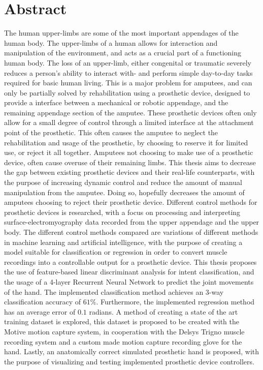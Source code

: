 \documentclass[../main.tex]{subfiles}
\begin{document}
\section*{Abstract}

The human upper-limbs are some of the most important appendages of the human body.
The upper-limbs of a human allows for interaction and manipulation of the environment, and acts as a crucial part of a functioning human body.
The loss of an upper-limb, either congenital or traumatic severely reduces a person's ability to interact with- and perform simple day-to-day tasks
required for basic human living.
This is a major problem for amputees, and can only be partially solved by rehabilitation using a prosthetic device, designed to provide a interface between a mechanical or robotic appendage, and the remaining appendage section of the amputee.
These prosthetic devices often only allow for a small degree of control through a limited interface at the attachment point of the prosthetic.
This often causes the amputee to neglect the rehabilitation and usage of the prosthetic, by choosing to reserve it for limited use, or reject it all together.
Amputees not choosing to make use of a prosthetic device, often cause overuse of their remaining limbs.
This thesis aims to decrease the gap between existing prosthetic devices and their real-life counterparts, with the purpose of increasing dynamic control and reduce the amount of manual manipulation from the amputee.
Doing so, hopefully decreases the amount of amputees choosing to reject their prosthetic device. 
Different control methods for prosthetic devices is researched, with a focus on processing and interpreting surface-electromyography data recorded from the upper appendage and the upper body.
The different control methods compared are variations of different methods in machine learning and artificial intelligence, with the purpose of creating a model suitable for classification or regression in order to convert muscle recordings into a controllable output for a prosthetic device.
This thesis proposes the use of feature-based linear discriminant analysis for intent classification, and the usage of a 4-layer Recurrent Neural Network to predict the joint movements of the hand.
The implemented classification method achieves an 3-way classification accuracy of $61\%$.
Furthermore, the implemented regression method has an average error of $0.1$ radians.
A method of creating a state of the art training dataset is explored, this dataset is proposed to be created with the Motive motion capture system, in cooperation with the Delsys Trigno muscle recording system and a custom made motion capture recording glove for the
hand.
Lastly, an anatomically correct simulated prosthetic hand is proposed, with the purpose of visualizing and testing implemented prosthetic device controllers.

\end{document}
